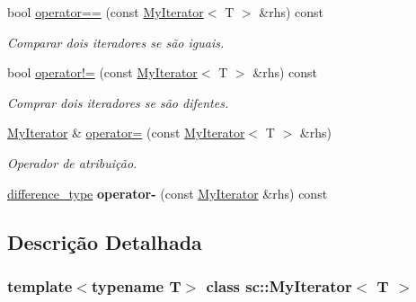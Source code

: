 \begin{DoxyCompactItemize}
\mbox{\label{classsc_1_1MyIterator_afde62290f677ab0c46f739008e7ed111}} 
bool \hyperlink{classsc_1_1MyIterator_afde62290f677ab0c46f739008e7ed111}{operator==} (const \hyperlink{classsc_1_1MyIterator}{My\+Iterator}$<$ T $>$ \&rhs) const
\begin{DoxyCompactList}\small\item\em Comparar dois iteradores se são iguais. \end{DoxyCompactList}\item 
\mbox{\label{classsc_1_1MyIterator_a6a64ad5515a5111089f73871a140e48c}} 
bool \hyperlink{classsc_1_1MyIterator_a6a64ad5515a5111089f73871a140e48c}{operator!=} (const \hyperlink{classsc_1_1MyIterator}{My\+Iterator}$<$ T $>$ \&rhs) const
\begin{DoxyCompactList}\small\item\em Comprar dois iteradores se são difentes. \end{DoxyCompactList}\item 
\mbox{\label{classsc_1_1MyIterator_af36f2a583da36cbd26ea491a09810e42}} 
\hyperlink{classsc_1_1MyIterator}{My\+Iterator} \& \hyperlink{classsc_1_1MyIterator_af36f2a583da36cbd26ea491a09810e42}{operator=} (const \hyperlink{classsc_1_1MyIterator}{My\+Iterator}$<$ T $>$ \&rhs)
\begin{DoxyCompactList}\small\item\em Operador de atribuição. \end{DoxyCompactList}\item 
\mbox{\label{classsc_1_1MyIterator_a52b15847aa07311fb00a27cff3cbfca2}} 
\hyperlink{classsc_1_1MyIterator_ab37e30d9d7abaca8b7ed9c4ba7371798}{difference\+\_\+type} {\bfseries operator-\/} (const \hyperlink{classsc_1_1MyIterator}{My\+Iterator} \&rhs) const
\end{DoxyCompactItemize}


\subsection{Descrição Detalhada}
\subsubsection*{template$<$typename T$>$\newline
class sc\+::\+My\+Iterator$<$ T $>$}

